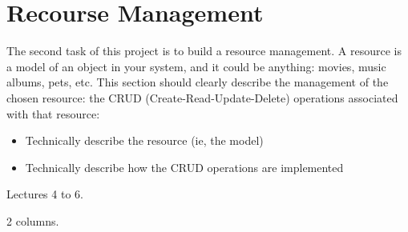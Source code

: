 \section{Recourse Management}

The second task of this project is to build a resource management.
A resource is a model of an object in your system, and it could be anything: movies, music albums, pets, etc.
This section should clearly describe the management of the chosen resource: the CRUD (Create-Read-Update-Delete) operations associated with that resource:

\begin{itemize}
    \item Technically describe the resource (ie, the model)
    \item Technically describe how the CRUD operations are implemented
\end{itemize}

 Lectures 4 to 6.

 2 columns.